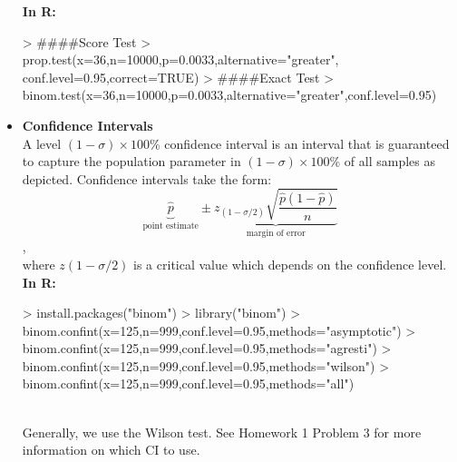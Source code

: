 \documentclass{article}
\begin{document}
\begin{itemize}
\begin{enumerate}
      \end{enumerate}
      \textbf{In R:}
\begin{Schunk}
\begin{Sinput}
> ####Score Test
> prop.test(x=36,n=10000,p=0.0033,alternative="greater", conf.level=0.95,correct=TRUE)
> ####Exact Test
> binom.test(x=36,n=10000,p=0.0033,alternative="greater",conf.level=0.95)
\end{Sinput}
\end{Schunk}
    \item \textbf{Confidence Intervals}
      \\ A level $(1 - \sigma) \times 100$\% confidence interval is an interval that is guaranteed to capture the population parameter in $(1 - \sigma) \times 100$\% of all samples as depicted. Confidence intervals take the form:
      $$\underbrace{\hat{p}}_\text{point estimate}\pm \underbrace{z_{(1-\sigma /2)}\sqrt{\frac{\hat{p}(1-\hat{p})}{n}}}_\text{margin of error}   $$,
      \\where $z(1-\sigma /2)$ is a critical value which depends on the confidence level.
      \\ \textbf{In R:}
\begin{Schunk}
\begin{Sinput}
> install.packages("binom")
> library("binom")
> binom.confint(x=125,n=999,conf.level=0.95,methods="asymptotic")
> binom.confint(x=125,n=999,conf.level=0.95,methods="agresti")
> binom.confint(x=125,n=999,conf.level=0.95,methods="wilson")
> binom.confint(x=125,n=999,conf.level=0.95,methods="all")
\end{Sinput}
\end{Schunk}
\\ Generally, we use the Wilson test. See Homework 1 Problem 3 for more information on which CI to use.
  \end{itemize}
\end{document}
